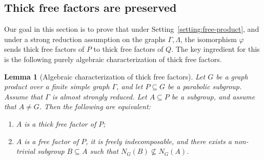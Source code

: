 \documentclass[a4paper,english,11pt]{article}
\newtheorem{lemma}[de]{Lemma}
\theoremstyle{definition}
\theoremstyle{remark}
\begin{document}
\subsection{Thick free factors are preserved}\label{sec:thick}

Our goal in this section is to prove that under Setting~\ref{setting:free-product}, and under a strong reduction assumption on the graphs $\Gamma,\Lambda$, the isomorphism $\varphi$ sends thick free factors of $P$ to thick free factors of $Q$. The key ingredient for this is the following purely algebraic characterization of thick free factors. 

\begin{lemma}[Algebraic characterization of thick free factors] 
\label{Lmm:Algebraic-characterization-thick-free}
Let $G$ be a graph product over a finite simple graph $\Gamma$, and let $P\subseteq G$ be a parabolic subgroup. Assume that $\Gamma$ is almost strongly reduced. Let $A\subseteq P$ be a subgroup, and assume that $A\neq G$. Then the following are equivalent:
\begin{enumerate}
\item\label{thick1} $A$ is a thick free factor of $P$;
\item\label{thick2} $A$ is a free factor of $P$, it is freely indecomposable, and there exists a non-trivial subgroup $B\subseteq A$ such that $N_G(B)\not\subseteq N_G(A)$.
\end{enumerate}
\end{lemma}
\end{document}

